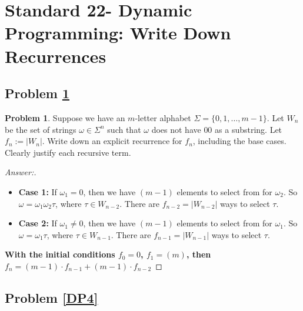 \documentclass[11pt]{article}
\theoremstyle{definition}
\theoremstyle{definition}
\newtheorem{required}{Problem}
\theoremstyle{definition}
\begin{document}
\newpage
\section{Standard 22- Dynamic Programming: Write Down Recurrences}

\subsection{Problem \ref{DP3}}

\begin{required} \label{DP3}
Suppose we have an $m$-letter alphabet $\Sigma = \{0, 1, \ldots, m-1\}$. Let $W_{n}$ be the set of strings $\omega \in \Sigma^{n}$ such that $\omega$ does not have $00$ as a substring. Let $f_{n} := |W_{n}|$. Write down an explicit recurrence for $f_{n}$, including the base cases. Clearly justify each recursive term.
\end{required}

\begin{proof}[Answer:] \
\begin{itemize}
\item \textbf{Case 1:} If $\omega_1 = 0$, then we have $(m - 1)$ elements to select from for $\omega_2$. So $\omega = \omega_1\omega_2\tau$, where $\tau \in W_{n-2}$. There are $f_{n-2} = |W_{n-2}|$ ways to select $\tau$.
\item \textbf{Case 2:} If $\omega_1 \neq 0$, then we have $(m - 1)$ elements to select from for $\omega_1$. So $\omega = \omega_1\tau$, where $\tau \in W_{n-1}$. There are $f_{n-1} = |W_{n-1}|$ ways to select $\tau$.\end{itemize}
\item \textbf{With the initial conditions $f_0 = 0$, $f_1 = (m)$, then \color{red} $f_n = (m - 1) \cdot f_{n-1} + (m - 1) \cdot f_{n-2}$}
\end{proof}

\begin{comment}
\begin{align*}
f_{n} &= \begin{cases} \text{Case1} & : \text{Condition1}, \\ 
\text{Case2} & : \text{Condition2}. 
\end{cases}
\end{align*}
\end{comment}




\newpage
\subsection{Problem \ref{DP4}}
\end{document}
